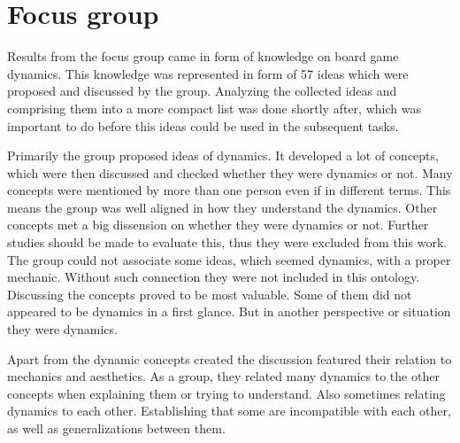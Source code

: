 \section{Focus group} 

Results from the focus group came in form of knowledge on board game dynamics. This knowledge was represented in form of 57 ideas which were proposed and discussed by the group. Analyzing the collected ideas and comprising them into a more compact list was done shortly after, which was important to do before this ideas could be used in the subsequent tasks. 

Primarily the group proposed ideas of dynamics. It developed a lot of concepts, which were then discussed and checked whether they were dynamics or not. Many concepts were mentioned by more than one person even if in different terms. This means the group was well aligned in how they understand the dynamics. Other concepts met a big dissension on whether they were dynamics or not. Further studies should be made to evaluate this, thus they were excluded from this work. The group could not associate some ideas, which seemed dynamics, with a proper mechanic. Without such connection they were not included in this ontology. Discussing the concepts proved to be most valuable. Some of them did not appeared to be dynamics in a first glance. But in another perspective or situation they were dynamics.

Apart from the dynamic concepts created the discussion featured their relation to mechanics and aesthetics. As a group, they related many dynamics to the other concepts when explaining them or trying to understand. Also sometimes relating dynamics to each other. Establishing that some are incompatible with each other, as well as generalizations between them.

